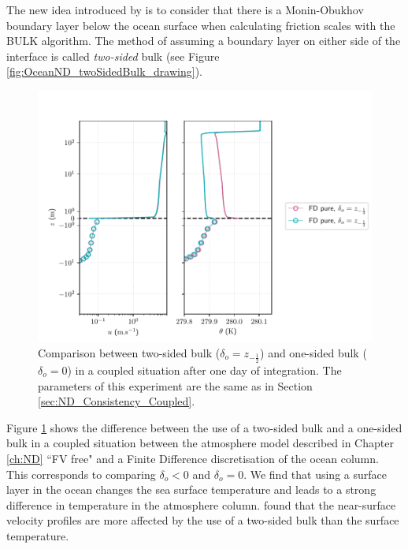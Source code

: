 The new idea introduced by \citep{pelletier_two-sided_2021} is to consider
that there is a Monin-Obukhov boundary layer 
below the ocean surface when calculating friction scales with the BULK algorithm. 
The method of assuming a boundary layer on either side of the interface is called
 \textit{two-sided} bulk (see Figure \ref{fig:OceanND_twoSidedBulk_drawing}).
	\begin{figure}
	\centering
\includegraphics[scale=0.6]{images/compare_two_sided_one_sided.pdf}
	\caption{Comparison between
	two-sided bulk ($\delta_o=z_{-\frac{1}{2}}$) and
	one-sided bulk ($\delta_o=0$) in a coupled
	situation after one day of integration. The parameters
	of this experiment are the same as in
	Section \ref{sec:ND_Consistency_Coupled}.
	}
	\label{fig:OceanND_twoSidedBulk_difference}
\end{figure}
\par
Figure \ref{fig:OceanND_twoSidedBulk_difference} shows the difference
between the use of a two-sided bulk and a one-sided bulk in
a coupled situation between the atmosphere model described in
Chapter \ref{ch:ND} ``FV free" and a Finite Difference
discretisation of the ocean column.
This corresponds to comparing $\delta_o < 0$ and $\delta_o = 0$.
We find that using a surface layer in the ocean changes the
sea surface temperature and leads to a strong difference
in temperature in the atmosphere column.
\citep{pelletier_two-sided_2021} found that the near-surface
velocity profiles are more affected by the use of a
two-sided bulk than the surface temperature.

